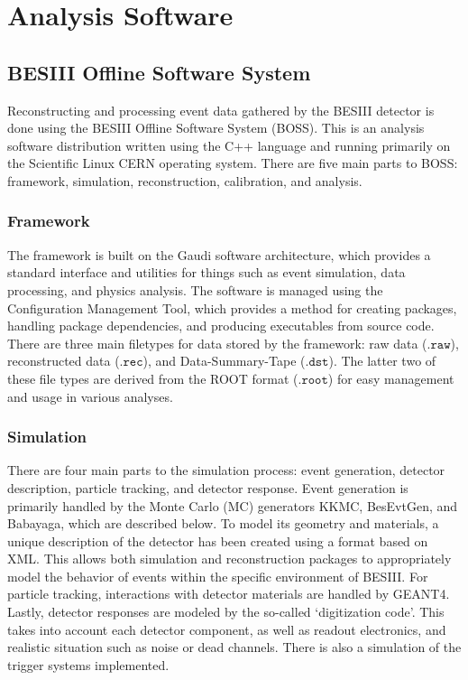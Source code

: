 \chapter{Analysis Software}
\label{ch:software}

\section{BESIII Offline Software System}

Reconstructing and processing event data gathered by the BESIII detector is done using the BESIII Offline Software System (BOSS).
This is an analysis software distribution written using the C++ language and running primarily on the Scientific Linux CERN operating system.
There are five main parts to BOSS: framework, simulation, reconstruction, calibration, and analysis.


\subsection{Framework}

The framework is built on the Gaudi software architecture, which provides a standard interface and utilities for things such as event simulation, data processing, and physics analysis.
The software is managed using the Configuration Management Tool, which provides a method for creating packages, handling package dependencies, and producing executables from source code.
There are three main filetypes for data stored by the framework: raw data ($\texttt{.raw}$), reconstructed data ($\texttt{.rec}$), and Data-Summary-Tape ($\texttt{.dst}$).
The latter two of these file types are derived from the ROOT format ($\texttt{.root}$) for easy management and usage in various analyses.


\subsection{Simulation}

There are four main parts to the simulation process: event generation, detector description, particle tracking, and detector response.
Event generation is primarily handled by the Monte Carlo (MC) generators KKMC, BesEvtGen, and Babayaga, which are described below.
To model its geometry and materials, a unique description of the detector has been created using a format based on XML.
This allows both simulation and reconstruction packages to appropriately model the behavior of events within the specific environment of BESIII.
For particle tracking, interactions with detector materials are handled by GEANT4.
Lastly, detector responses are modeled by the so-called `digitization code'.
This takes into account each detector component, as well as readout electronics, and realistic situation such as noise or dead channels.
There is also a simulation of the trigger systems implemented.


